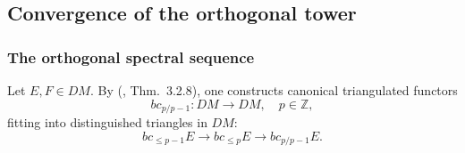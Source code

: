 \documentclass[12pt,a4paper]{article}
\theoremstyle{definition}
\newcommand{\Z}{\mathbb{Z}}
\begin{document}
\subsection{Convergence of the orthogonal tower}
\label{subsec:convergence-tower}

\subsubsection{The orthogonal spectral sequence}\label{sec:orthogonal-SS}

Let $E,F\in DM$.  By (\cite{Pel17}, Thm.\ 3.2.8), one constructs canonical
triangulated functors
\[
  bc_{p/p-1}:DM\longrightarrow DM,\quad p\in\Z,
\]
fitting into distinguished triangles in $DM$:
\[
  bc_{\leq p-1}E\longrightarrow bc_{\leq p}E\longrightarrow bc_{p/p-1}E.
\]
\end{document}
